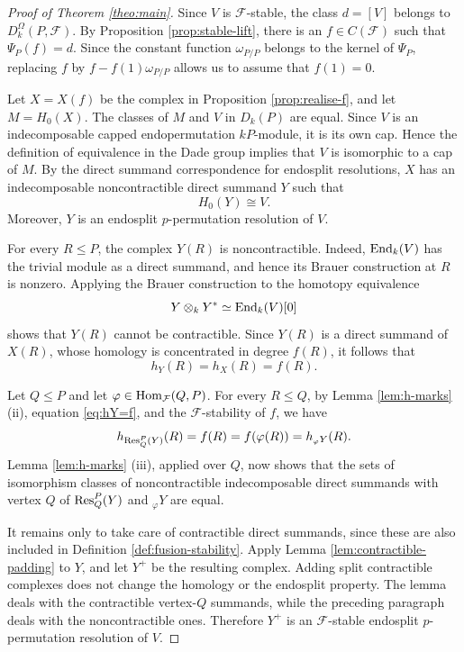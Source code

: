 \documentclass[preprint,12pt,3p]{elsarticle}
\def\Res{{\rm Res}}
\def\Hom{{\rm Hom}}
\def\End{{\rm End}}
\def\F{\mathcal{F}}
\begin{document}
\begin{proof}[Proof of Theorem \ref{theo:main}]
Since $V$ is $\F$-stable, the class $d=[V]$ belongs to $D_k^\Omega(P,\F)$.  By Proposition \ref{prop:stable-lift}, there is an $f\in C(\F)$ such that $\Psi_P(f)=d$.  Since the constant function $\omega_{P/P}$ belongs to the kernel of $\Psi_P$, replacing $f$ by $f-f(1)\omega_{P/P}$ allows us to assume that $f(1)=0$.

Let $X=X(f)$ be the complex in Proposition \ref{prop:realise-f}, and let $M=H_0(X)$. The classes of $M$ and $V$ in $D_k(P)$ are equal. Since $V$ is an indecomposable capped endopermutation $kP$-module, it is its own cap. Hence the definition of equivalence in the Dade group implies that $V$ is isomorphic to a cap of $M$. By the direct summand correspondence for endosplit resolutions, $X$ has an indecomposable noncontractible direct summand $Y$ such that
$$
 H_0(Y)\cong V.
$$
Moreover, $Y$ is an endosplit $p$-permutation resolution of $V$.

For every $R\leq P$, the complex $Y(R)$ is noncontractible. Indeed, $\End_k(V)$ has the trivial module as a direct summand, and hence its Brauer construction at $R$ is nonzero. Applying the Brauer construction to the homotopy equivalence
$$
 Y\otimes_k Y^*\simeq \End_k(V)[0]
$$
shows that $Y(R)$ cannot be contractible. Since $Y(R)$ is a direct summand of $X(R)$, whose homology is concentrated in degree $f(R)$, it follows that
\begin{equation}\label{eq:hY=f}
 h_Y(R)=h_X(R)=f(R).
\end{equation}

Let $Q\leq P$ and let $\varphi\in\Hom_\F(Q,P)$.  For every $R\leq Q$, by Lemma \ref{lem:h-marks} (ii), equation \eqref{eq:hY=f}, and the $\F$-stability of $f$, we have
$$
 h_{\Res_Q^P(Y)}(R)=f(R)=f(\varphi(R))=h_{{}_\varphi Y}(R).
$$
Lemma \ref{lem:h-marks} (iii), applied over $Q$, now shows that the sets of isomorphism classes of noncontractible indecomposable direct summands with vertex $Q$ of $\Res_Q^P(Y)$ and ${}_\varphi Y$ are equal.

It remains only to take care of contractible direct summands, since these are also included in Definition \ref{def:fusion-stability}.  Apply Lemma \ref{lem:contractible-padding} to $Y$, and let $Y^+$ be the resulting complex.  Adding split contractible complexes does not change the homology or the endosplit property.  The lemma deals with the contractible vertex-$Q$ summands, while the preceding paragraph deals with the noncontractible ones.  Therefore $Y^+$ is an $\F$-stable endosplit $p$-permutation resolution of $V$.
\end{proof}
\end{document}
